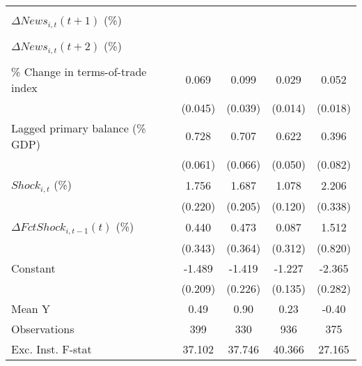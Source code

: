 {\begin{tabular}{l*{4}{c}}
                    &                     &                     &                     &                     \\
\addlinespace
$ \Delta News_{i,t}(t+1)$ (\%)&                     &                     &                     &                     \\
                    &                     &                     &                     &                     \\
\addlinespace
$ \Delta News_{i,t}(t+2)$ (\%)&                     &                     &                     &                     \\
                    &                     &                     &                     &                     \\
\addlinespace
\% Change in terms-of-trade index&       0.069         &       0.099\sym{**} &       0.029\sym{**} &       0.052\sym{***}\\
                    &     (0.045)         &     (0.039)         &     (0.014)         &     (0.018)         \\
\addlinespace
Lagged primary balance (\% GDP)&       0.728\sym{***}&       0.707\sym{***}&       0.622\sym{***}&       0.396\sym{***}\\
                    &     (0.061)         &     (0.066)         &     (0.050)         &     (0.082)         \\
\addlinespace
$ Shock_{i,t}$ (\%) &       1.756\sym{***}&       1.687\sym{***}&       1.078\sym{***}&       2.206\sym{***}\\
                    &     (0.220)         &     (0.205)         &     (0.120)         &     (0.338)         \\
\addlinespace
$ \Delta FctShock_{i,t-1}(t)$ (\%)&       0.440         &       0.473         &       0.087         &       1.512\sym{*}  \\
                    &     (0.343)         &     (0.364)         &     (0.312)         &     (0.820)         \\
\addlinespace
Constant            &      -1.489\sym{***}&      -1.419\sym{***}&      -1.227\sym{***}&      -2.365\sym{***}\\
                    &     (0.209)         &     (0.226)         &     (0.135)         &     (0.282)         \\
\midrule
Mean Y              &        0.49         &        0.90         &        0.23         &       -0.40         \\
Observations        &         399         &         330         &         936         &         375         \\
Exc. Inst. F-stat   &      37.102         &      37.746         &      40.366         &      27.165         \\
\bottomrule
\end{tabular}
}
